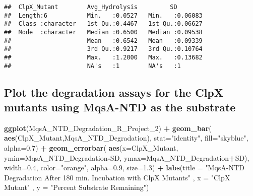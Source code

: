 \documentclass[]{article}
\newenvironment{Shaded}{\begin{snugshade}}{\end{snugshade}}
\newcommand{\DataTypeTok}[1]{\textcolor[rgb]{0.13,0.29,0.53}{#1}}
\newcommand{\DecValTok}[1]{\textcolor[rgb]{0.00,0.00,0.81}{#1}}
\newcommand{\FloatTok}[1]{\textcolor[rgb]{0.00,0.00,0.81}{#1}}
\newcommand{\KeywordTok}[1]{\textcolor[rgb]{0.13,0.29,0.53}{\textbf{#1}}}
\newcommand{\NormalTok}[1]{#1}
\newcommand{\OperatorTok}[1]{\textcolor[rgb]{0.81,0.36,0.00}{\textbf{#1}}}
\newcommand{\StringTok}[1]{\textcolor[rgb]{0.31,0.60,0.02}{#1}}
\begin{document}
\begin{Shaded}
\end{Shaded}

\begin{verbatim}
##  ClpX_Mutant        Avg_Hydrolysis         SD         
##  Length:6           Min.   :0.0527   Min.   :0.06083  
##  Class :character   1st Qu.:0.4467   1st Qu.:0.06627  
##  Mode  :character   Median :0.6500   Median :0.09538  
##                     Mean   :0.6542   Mean   :0.09339  
##                     3rd Qu.:0.9217   3rd Qu.:0.10764  
##                     Max.   :1.2000   Max.   :0.13682  
##                     NA's   :1        NA's   :1
\end{verbatim}

\hypertarget{plot-the-degradation-assays-for-the-clpx-mutants-using-mqsa-ntd-as-the-substrate}{%
\subsection{Plot the degradation assays for the ClpX mutants using
MqsA-NTD as the
substrate}\label{plot-the-degradation-assays-for-the-clpx-mutants-using-mqsa-ntd-as-the-substrate}}

\begin{Shaded}
\begin{Highlighting}[]
\KeywordTok{ggplot}\NormalTok{(MqsA_NTD_Degradation_R_Project_}\DecValTok{2}\NormalTok{) }\OperatorTok{+}\StringTok{ }
\StringTok{  }\KeywordTok{geom_bar}\NormalTok{( }\KeywordTok{aes}\NormalTok{(ClpX_Mutant,MqsA_NTD_Degradation), }\DataTypeTok{stat=}\StringTok{"identity"}\NormalTok{, }\DataTypeTok{fill=}\StringTok{"skyblue"}\NormalTok{, }\DataTypeTok{alpha=}\FloatTok{0.7}\NormalTok{) }\OperatorTok{+}
\StringTok{  }\KeywordTok{geom_errorbar}\NormalTok{( }\KeywordTok{aes}\NormalTok{(}\DataTypeTok{x=}\NormalTok{ClpX_Mutant, }\DataTypeTok{ymin=}\NormalTok{MqsA_NTD_Degradation}\OperatorTok{-}\NormalTok{SD, }\DataTypeTok{ymax=}\NormalTok{MqsA_NTD_Degradation}\OperatorTok{+}\NormalTok{SD),}
                 \DataTypeTok{width=}\FloatTok{0.4}\NormalTok{, }\DataTypeTok{color=}\StringTok{"orange"}\NormalTok{, }\DataTypeTok{alpha=}\FloatTok{0.9}\NormalTok{, }\DataTypeTok{size=}\FloatTok{1.3}\NormalTok{) }\OperatorTok{+}
\StringTok{  }\KeywordTok{labs}\NormalTok{(}\DataTypeTok{title =} \StringTok{"MqsA-NTD Degradation After 180 min. Incubation with ClpX Mutants"}\NormalTok{ , }
       \DataTypeTok{x =} \StringTok{"ClpX Mutant"}\NormalTok{ , }\DataTypeTok{y =} \StringTok{"Percent Substrate Remaining"}\NormalTok{)}
\end{Highlighting}
\end{Shaded}
\end{document}
